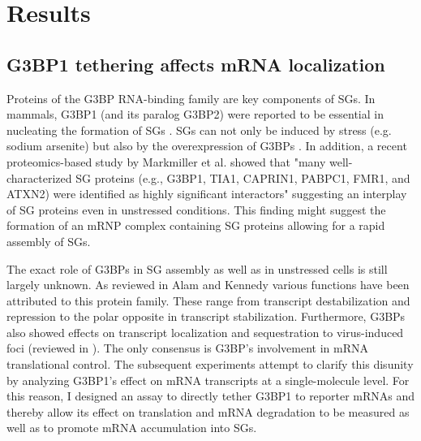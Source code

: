 \chapter{Results}


\section{G3BP1 tethering affects mRNA localization}

Proteins of the G3BP RNA-binding family are key components of SGs.
In mammals, G3BP1 (and its paralog G3BP2) were reported to be essential in nucleating the formation of SGs \cite{kedersha_g3bp-caprin1-usp10_2016}.
SGs can not only be induced by stress (e.g. sodium arsenite) but also by the overexpression of G3BPs \cite{tourriere_rasgap-associated_2003}.
In addition, a recent proteomics-based study by Markmiller et al. \cite{markmiller_context-dependent_2018} showed that "many well-characterized SG proteins (e.g., G3BP1, TIA1, CAPRIN1, PABPC1, FMR1, and ATXN2) were identified as highly significant interactors" suggesting an interplay of SG proteins even in unstressed conditions.
This finding might suggest the formation of an mRNP complex containing SG proteins allowing for a rapid assembly of SGs.

The exact role of G3BPs in SG assembly as well as in unstressed cells is still largely unknown.
As reviewed in Alam and Kennedy \cite{alam_rasputin_2019} various functions have been attributed to this protein family.
These range from transcript destabilization and repression to the polar opposite in transcript stabilization.
Furthermore, G3BPs also showed effects on transcript localization and sequestration to virus-induced foci (reviewed in \cite{zhang_chronic_2019}).
The only consensus is G3BP's involvement in mRNA translational control.
The subsequent experiments attempt to clarify this disunity by analyzing G3BP1's effect on mRNA transcripts at a single-molecule level.
For this reason, I designed an assay to directly tether G3BP1 to reporter mRNAs and thereby allow its effect on translation and mRNA degradation to be measured as well as to promote mRNA accumulation into SGs.

